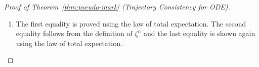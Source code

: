\documentclass[11pt, a4paper, oneside, reqno]{amsart}
\begin{document}
\begin{proof}[Proof of Theorem~\ref{thm:pseudo-mark} (Trajectory Consistency for ODE)]
\begin{enumerate}
    Then, from the definition of $\zeta^n$ and the Lipschitzness of $b$, we have,
    \begin{eqnarray}
        \mathbb{E}[|\hat{X}^{n+1}-X_i^{n+1}|^2] &\leq& 3\mathbb{E}[|\hat{X}^{n}-X_i^{n}|^2] + 3\mathbb{E}[|\hat{b}(\hat{X}^n)-\hat{b}(X_i^n)|^2] \Delta t^2 \nonumber\\
        &\leq& (3 + C\Delta t^2)\mathbb{E}[|\hat{X}^{n}-X_i^{n}|^2] \nonumber\\
        &\leq&  (3 + C\Delta t^2)^{n+1} \mathbb{E}[|\hat{X}^{0}-X_i^{0}|^2] = 0,
    \end{eqnarray}
    which implies $\hat{X}^n=X^n_i \quad a.s. \quad \forall n$. Then,
    \begin{eqnarray}
        \mathbb{E}[|\hat{X}^{n}-X_i(t_n)|^2] = \mathbb{E}[|{X}_i^{n}-X_i(t_n)|^2] = \mathbb{E}[|{\phi}_i^{n}(X_0)-\phi_i(t_n,X_0)|^2]
    \end{eqnarray}
    where we defined the (flow) maps $\phi^n(X_0):=X^n \ s.t. \ X^0=X_0$ and $\phi(t_n,X_0):=X(t_n) \ s.t. \ X(t_0)=X_0$. 
    Finally, since the first-order Euler scheme converges with rate $O(\Delta t)$ \cite{Süli_Mayers_2003}, we have,
    \begin{eqnarray}
        |\phi^n(X_0)-\phi(t_n,X_0)|^2 = O(\Delta t^2),
    \end{eqnarray}
    for any initial condition $X_0$. Noting that taking expectation preserves the rate, we have,
    \begin{eqnarray}
        \mathbb{E}[|\hat{X}^n-X_i(t_n)|^2]=\mathbb{E}[|X^n-X(t_n)|^2] = \mathbb{E}_{\mu_0}[|{\phi}_i^{n}(X_0)-\phi_i(t_n,X_0)|^2] = O(\Delta t^2).
    \end{eqnarray}
    \item The first equality is proved using the law of total expectation. The second equality follows from the definition of $\zeta^n$ and the last equality is shown again using the law of total expectation.
\end{enumerate}
\end{proof}
\end{document}

